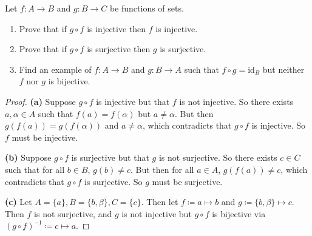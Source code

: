 \documentclass[addpoints,10pt]{exam}
\theoremstyle{plain}
\theoremstyle{definition}
\newtheorem{prob}[thm]{Problem}
\theoremstyle{plain}
\theoremstyle{plain}
\theoremstyle{definition}
\let\oldprob\prob
\let\endoldprob\endprob
\renewenvironment{prob}
  {\begin{singlespace}\oldprob}
  {\endoldprob\end{singlespace}}
\newcommand{\id}{\ensuremath{\mathrm{id}}}
\begin{document}
\setcounter{thm}{0} %
\begin{prob}
Let $f : A \to B$ and $g : B \to C$ be functions of sets.
\begin{enumerate}[label=(\alph*)]
\item Prove that if $g \circ f$ is injective then $f$ is injective.
\item Prove that if $g \circ f$ is surjective then $g$ is surjective.
\item Find an example of $f : A \to B$ and $g : B \to A$ such that $f \circ g = \id_B$ but neither $f$ nor $g$ is bijective.
\end{enumerate}
\end{prob}

\begin{proof}
\textbf{(a)}
Suppose $g\circ f$ is injective but that $f$ is not injective. So there exists $a,\alpha\in A$ such that $f(a)=f(\alpha)$ but $a\neq \alpha$. But then $g(f(a))=g(f(\alpha))$ and $a\neq \alpha$, which contradicts that $g\circ f$ is injective. So $f$ must be injective.

\textbf{(b)} Suppose $g\circ f$ is surjective but that $g$ is not surjective. So there exists $c\in C$ such that for all $b\in B$, $g(b)\neq c$. But then for all $a\in A$, $g(f(a))\neq c$, which contradicts that $g\circ f$ is surjective. So $g$ must be surjective.

\textbf{(c)} Let $A=\{a\},B=\{b,\beta\},C=\{c\}$. Then let $f\coloneq a\mapsto b$ and $g\coloneq \{b,\beta\}\mapsto c$. Then $f$ is not surjective, and $g$ is not injective but $g\circ f$ is bijective via $(g\circ f)^{-1}\coloneq c\mapsto a.$

\end{proof}
\end{document}
